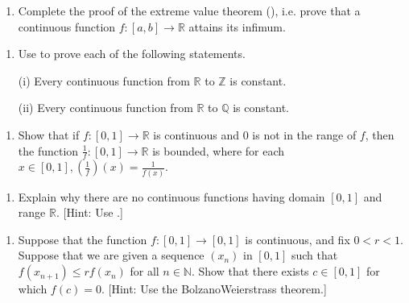 \documentclass[letterpaper,10pt,english]{jupyterBook}
\begin{document}
\label{\detokenize{Problems:id26}}\begin{enumerate}
%
\setcounter{enumi}{25}
\item {} 
\sphinxAtStartPar
Complete the proof of the extreme value theorem (), i.e. prove that a continuous function \(f:[a,b]\to\mathbb{R}\) attains its infimum.

\end{enumerate}
\label{\detokenize{Problems:id27}}\begin{enumerate}
%
\setcounter{enumi}{26}
\item {} 
\sphinxAtStartPar
Use  to prove each of the following statements.

\sphinxAtStartPar
(i) Every continuous function from \(\mathbb{R}\) to \(\mathbb{Z}\) is constant.

\sphinxAtStartPar
(ii) Every continuous function from \(\mathbb{R}\) to \(\mathbb{Q}\) is constant.

\end{enumerate}
\label{\detokenize{Problems:id28}}\begin{enumerate}
%
\setcounter{enumi}{27}
\item {} 
\sphinxAtStartPar
Show that if \(f:[0,1] \rightarrow \mathbb{R}\) is continuous and \(0\) is not in the range of  \(f\), then the function \(\frac{1}{f}:[0,1]\to \mathbb{R}\) is bounded, where for each \(x \in [0,1], \left(\frac{1}{f}\right)(x) = \frac{1}{f(x)}\).

\end{enumerate}
\label{\detokenize{Problems:id29}}\begin{enumerate}
%
\setcounter{enumi}{28}
\item {} 
\sphinxAtStartPar
Explain why there are no continuous functions having domain \([0, 1]\) and range \(\mathbb{R}\). {[}Hint: Use .{]}

\end{enumerate}
\label{\detokenize{Problems:id30}}\begin{enumerate}
%
\setcounter{enumi}{29}
\item {} 
\sphinxAtStartPar
Suppose that the function \(f:[0,1] \rightarrow [0,1]\) is continuous, and fix \(0 < r < 1\). Suppose that we are given a sequence \((x_{n})\) in \([0,1]\) such that \(f(x_{n+1}) \leq rf(x_{n})\) for all \(n\in\mathbb{N}\). Show that there exists \(c \in [0, 1]\) for which \(f(c) = 0\). {[}Hint: Use the Bolzano\sphinxhyphen{}Weierstrass theorem.{]}

\end{enumerate}
\end{document}
